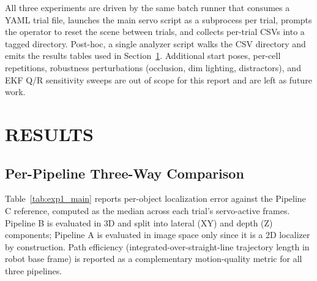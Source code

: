 \documentclass[letterpaper, 10 pt, conference]{ieeeconf}  %
\begin{document}
All three experiments are driven by the same batch runner that consumes a YAML trial file, launches the main servo script as a subprocess per trial, prompts the operator to reset the scene between trials, and collects per-trial CSVs into a tagged directory. Post-hoc, a single analyzer script walks the CSV directory and emits the results tables used in Section~\ref{sec:results}. Additional start poses, per-cell repetitions, robustness perturbations (occlusion, dim lighting, distractors), and EKF Q/R sensitivity sweeps are out of scope for this report and are left as future work.


\section{RESULTS}
\label{sec:results}

\subsection{Per-Pipeline Three-Way Comparison}

Table~\ref{tab:exp1_main} reports per-object localization error against the Pipeline C reference, computed as the median across each trial's servo-active frames. Pipeline B is evaluated in 3D and split into lateral (XY) and depth (Z) components; Pipeline A is evaluated in image space only since it is a 2D localizer by construction. Path efficiency (integrated-over-straight-line trajectory length in robot base frame) is reported as a complementary motion-quality metric for all three pipelines.
\end{document}
